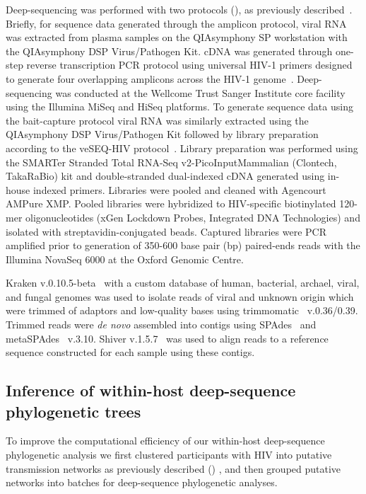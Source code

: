 \documentclass[10pt,letterpaper]{article}
\begin{document}
Deep-sequencing was performed with two protocols (), as previously described~\cite{monod2023}. Briefly, for sequence data generated through the amplicon protocol, viral RNA was extracted from plasma samples on the QIAsymphony SP workstation with the QIAsymphony DSP Virus/Pathogen Kit. cDNA was generated through one-step reverse transcription PCR protocol using universal HIV-1 primers designed to generate four overlapping amplicons across the HIV-1 genome~\cite{gall2012}. Deep-sequencing was conducted at the Wellcome Trust Sanger Institute core facility using the Illumina MiSeq and HiSeq platforms. To generate sequence data using the bait-capture protocol viral RNA was similarly extracted using the QIAsymphony DSP Virus/Pathogen Kit followed by library preparation according to the veSEQ-HIV protocol~\cite{bonsall2020}. Library preparation was performed using the SMARTer Stranded Total RNA-Seq v2-PicoInputMammalian (Clontech, TakaRaBio) kit and double-stranded dual-indexed cDNA generated using in-house indexed primers. Libraries were pooled and cleaned with Agencourt AMPure XMP. Pooled libraries were hybridized to HIV-specific biotinylated 120-mer oligonucleotides (xGen Lockdown Probes, Integrated DNA Technologies) and isolated with streptavidin-conjugated beads. Captured libraries were PCR amplified prior to generation of 350-600 base pair (bp) paired-ends reads with the Illumina NovaSeq 6000 at the Oxford Genomic Centre. \par

Kraken v.0.10.5-beta~\cite{wood2014} with a custom database of human, bacterial, archael, viral, and fungal genomes was used to isolate reads of viral and unknown origin which were trimmed of adaptors and low-quality bases using trimmomatic~\cite{bolger2014} v.0.36/0.39. Trimmed reads were \textit{de novo} assembled into contigs using SPAdes~\cite{bankevich2012} and metaSPAdes~\cite{nurk2017} v.3.10. Shiver v.1.5.7~\cite{wymant2018} was used to align reads to a reference sequence constructed for each sample using these contigs. \par  

\subsection{Inference of within-host deep-sequence phylogenetic trees}
\label{sec:phsc_methods}
To improve the computational efficiency of our within-host deep-sequence phylogenetic analysis we first clustered participants with HIV into putative transmission networks as previously described () \cite{monod2023,xi2021}, and then grouped putative networks into batches for deep-sequence phylogenetic analyses. \par
\end{document}
